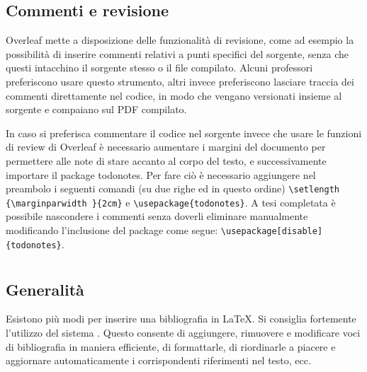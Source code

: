 \documentclass[12pt]{report}
\begin{document}
    \subsection{Commenti e revisione}

    Overleaf mette a disposizione delle funzionalità di revisione, come ad esempio la possibilità di inserire commenti relativi a punti specifici del sorgente, senza che questi intacchino il sorgente stesso o il file compilato. Alcuni professori preferiscono usare questo strumento, altri invece preferiscono lasciare traccia dei commenti direttamente nel codice, in modo che vengano versionati insieme al sorgente e compaiano sul PDF compilato.

    In caso si preferisca commentare il codice nel sorgente invece che usare le funzioni di review di Overleaf è necessario aumentare i margini del documento per permettere alle note di stare accanto al corpo del testo, e successivamente importare il package todonotes. Per fare ciò è necessario aggiungere nel preambolo i seguenti comandi (su due righe ed in questo ordine) \verb|\setlength {\marginparwidth }{2cm}| e \verb|\usepackage{todonotes}|. A tesi completata è possibile nascondere i commenti senza doverli eliminare manualmente modificando l'inclusione del package come segue: \verb|\usepackage[disable]{todonotes}|.


    \section{}
    \label{sec:bibtex}

    \subsection{Generalit\`a}

    Esistono più modi per inserire una bibliografia in \LaTeX. Si consiglia fortemente l'utilizzo del sistema . Questo consente di aggiungere, rimuovere e modificare voci di bibliografia in maniera efficiente, di formattarle, di riordinarle a piacere e aggiornare automaticamente i corrispondenti riferimenti nel testo, ecc.
\end{document}
